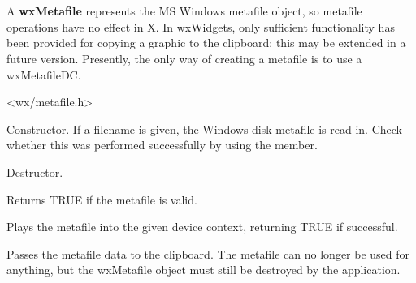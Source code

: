\section{}\label{wxmetafile}

A {\bf wxMetafile} represents the MS Windows metafile object, so metafile
operations have no effect in X. In wxWidgets, only sufficient functionality
has been provided for copying a graphic to the clipboard; this may be extended
in a future version. Presently, the only way of creating a metafile
is to use a wxMetafileDC.




<wx/metafile.h>






Constructor. If a filename is given, the Windows disk metafile is
read in. Check whether this was performed successfully by
using the  member.



Destructor.

\label{wxmetafileok}


Returns TRUE if the metafile is valid.

\label{wxmetafileplay}


Plays the metafile into the given device context, returning
TRUE if successful.



Passes the metafile data to the clipboard. The metafile can no longer be
used for anything, but the wxMetafile object must still be destroyed by
the application.

